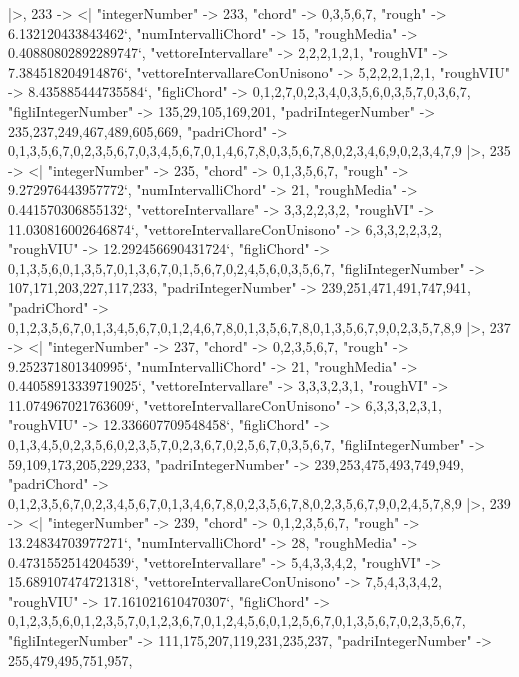 \documentclass[
]{article}
\begin{document}
\begin{DatasetVerbatim}
  |>,
  233 -> <|
    "integerNumber" -> 233,
    "chord" -> {0,3,5,6,7},
    "rough" -> 6.132120433843462`,
    "numIntervalliChord" -> 15,
    "roughMedia" -> 0.40880802892289747`,
    "vettoreIntervallare" -> {2,2,2,1,2,1},
    "roughVI" -> 7.384518204914876`,
    "vettoreIntervallareConUnisono" -> {5,2,2,2,1,2,1},
    "roughVIU" -> 8.435885444735584`,
    "figliChord" -> {{0,1,2,7},{0,2,3,4},{0,3,5,6},{0,3,5,7},{0,3,6,7}},
    "figliIntegerNumber" -> {135,29,105,169,201},
    "padriIntegerNumber" -> {235,237,249,467,489,605,669},
    "padriChord" -> {{0,1,3,5,6,7},{0,2,3,5,6,7},{0,3,4,5,6,7},{0,1,4,6,7,8},{0,3,5,6,7,8},{0,2,3,4,6,9},{0,2,3,4,7,9}}
  |>,
  235 -> <|
    "integerNumber" -> 235,
    "chord" -> {0,1,3,5,6,7},
    "rough" -> 9.272976443957772`,
    "numIntervalliChord" -> 21,
    "roughMedia" -> 0.441570306855132`,
    "vettoreIntervallare" -> {3,3,2,2,3,2},
    "roughVI" -> 11.030816002646874`,
    "vettoreIntervallareConUnisono" -> {6,3,3,2,2,3,2},
    "roughVIU" -> 12.292456690431724`,
    "figliChord" -> {{0,1,3,5,6},{0,1,3,5,7},{0,1,3,6,7},{0,1,5,6,7},{0,2,4,5,6},{0,3,5,6,7}},
    "figliIntegerNumber" -> {107,171,203,227,117,233},
    "padriIntegerNumber" -> {239,251,471,491,747,941},
    "padriChord" -> {{0,1,2,3,5,6,7},{0,1,3,4,5,6,7},{0,1,2,4,6,7,8},{0,1,3,5,6,7,8},{0,1,3,5,6,7,9},{0,2,3,5,7,8,9}}
  |>,
  237 -> <|
    "integerNumber" -> 237,
    "chord" -> {0,2,3,5,6,7},
    "rough" -> 9.252371801340995`,
    "numIntervalliChord" -> 21,
    "roughMedia" -> 0.44058913339719025`,
    "vettoreIntervallare" -> {3,3,3,2,3,1},
    "roughVI" -> 11.074967021763609`,
    "vettoreIntervallareConUnisono" -> {6,3,3,3,2,3,1},
    "roughVIU" -> 12.336607709548458`,
    "figliChord" -> {{0,1,3,4,5},{0,2,3,5,6},{0,2,3,5,7},{0,2,3,6,7},{0,2,5,6,7},{0,3,5,6,7}},
    "figliIntegerNumber" -> {59,109,173,205,229,233},
    "padriIntegerNumber" -> {239,253,475,493,749,949},
    "padriChord" -> {{0,1,2,3,5,6,7},{0,2,3,4,5,6,7},{0,1,3,4,6,7,8},{0,2,3,5,6,7,8},{0,2,3,5,6,7,9},{0,2,4,5,7,8,9}}
  |>,
  239 -> <|
    "integerNumber" -> 239,
    "chord" -> {0,1,2,3,5,6,7},
    "rough" -> 13.24834703977271`,
    "numIntervalliChord" -> 28,
    "roughMedia" -> 0.4731552514204539`,
    "vettoreIntervallare" -> {5,4,3,3,4,2},
    "roughVI" -> 15.689107474721318`,
    "vettoreIntervallareConUnisono" -> {7,5,4,3,3,4,2},
    "roughVIU" -> 17.161021610470307`,
    "figliChord" -> {{0,1,2,3,5,6},{0,1,2,3,5,7},{0,1,2,3,6,7},{0,1,2,4,5,6},{0,1,2,5,6,7},{0,1,3,5,6,7},{0,2,3,5,6,7}},
    "figliIntegerNumber" -> {111,175,207,119,231,235,237},
    "padriIntegerNumber" -> {255,479,495,751,957},

\end{DatasetVerbatim}
\end{document}

